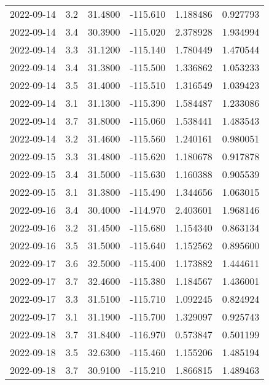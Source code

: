 \begin{tabular}{lrrrrr}
2022-09-14 &       3.2 &  31.4800 &  -115.610 &         1.188486 &         0.927793 \\
2022-09-14 &       3.4 &  30.3900 &  -115.020 &         2.378928 &         1.934994 \\
2022-09-14 &       3.3 &  31.1200 &  -115.140 &         1.780449 &         1.470544 \\
2022-09-14 &       3.4 &  31.3800 &  -115.500 &         1.336862 &         1.053233 \\
2022-09-14 &       3.5 &  31.4000 &  -115.510 &         1.316549 &         1.039423 \\
2022-09-14 &       3.1 &  31.1300 &  -115.390 &         1.584487 &         1.233086 \\
2022-09-14 &       3.7 &  31.8000 &  -115.060 &         1.538441 &         1.483543 \\
2022-09-14 &       3.2 &  31.4600 &  -115.560 &         1.240161 &         0.980051 \\
2022-09-15 &       3.3 &  31.4800 &  -115.620 &         1.180678 &         0.917878 \\
2022-09-15 &       3.4 &  31.5000 &  -115.630 &         1.160388 &         0.905539 \\
2022-09-15 &       3.1 &  31.3800 &  -115.490 &         1.344656 &         1.063015 \\
2022-09-16 &       3.4 &  30.4000 &  -114.970 &         2.403601 &         1.968146 \\
2022-09-16 &       3.2 &  31.4500 &  -115.680 &         1.154340 &         0.863134 \\
2022-09-16 &       3.5 &  31.5000 &  -115.640 &         1.152562 &         0.895600 \\
2022-09-17 &       3.6 &  32.5000 &  -115.400 &         1.173882 &         1.444611 \\
2022-09-17 &       3.7 &  32.4600 &  -115.380 &         1.184567 &         1.436001 \\
2022-09-17 &       3.3 &  31.5100 &  -115.710 &         1.092245 &         0.824924 \\
2022-09-17 &       3.1 &  31.1900 &  -115.700 &         1.329097 &         0.925743 \\
2022-09-18 &       3.7 &  31.8400 &  -116.970 &         0.573847 &         0.501199 \\
2022-09-18 &       3.5 &  32.6300 &  -115.460 &         1.155206 &         1.485194 \\
2022-09-18 &       3.7 &  30.9100 &  -115.210 &         1.866815 &         1.489463 \\

\end{tabular}
